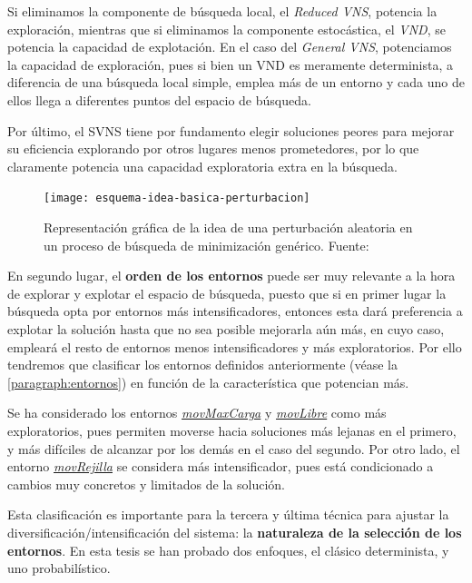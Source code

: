 Si eliminamos la componente de búsqueda local, el \textit{Reduced VNS}, potencia la exploración, mientras que si eliminamos la componente estocástica, el \textit{VND}, se potencia la capacidad de explotación.
En el caso del \textit{General VNS}, potenciamos la capacidad de exploración, pues si bien un VND es meramente determinista, a diferencia de una búsqueda local simple, emplea más de un entorno y cada uno de ellos llega a diferentes puntos del espacio de búsqueda.

Por último, el SVNS tiene por fundamento elegir soluciones peores para mejorar su eficiencia explorando por otros lugares menos prometedores, por lo que claramente potencia una capacidad exploratoria extra en la búsqueda.

\begin{figure}
    \centering    \texttt{[image: esquema-idea-basica-perturbacion]}
    \caption[Representación gráfica de la idea de una perturbación aleatoria en un proceso de búsqueda genérico]{Representación gráfica de la idea de una perturbación aleatoria en un proceso de búsqueda de minimización genérico. Fuente:~\cite{sota:metaheuristicas-design-impl}}
    \label{fig:esquema-idea-basica-perturbacion}
\end{figure}

En segundo lugar, el \textbf{orden de los entornos} puede ser muy relevante a la hora de explorar y explotar el espacio de búsqueda, puesto que si en primer lugar la búsqueda opta por entornos más intensificadores, entonces esta dará preferencia a explotar la solución hasta que no sea posible mejorarla aún más, en cuyo caso, empleará el resto de entornos menos intensificadores y más exploratorios. Por ello tendremos que clasificar los entornos definidos anteriormente (véase la \autoref{paragraph:entornos}) en función de la característica que potencian más.

Se ha considerado los entornos \hyperref[entorno:movMaxCarga]{\textit{movMaxCarga}} y \hyperref[entorno:movLibre]{\textit{movLibre}} como más exploratorios, pues permiten moverse hacia soluciones más lejanas en el primero, y más difíciles de alcanzar por los demás en el caso del segundo. Por otro lado, el entorno \hyperref[entorno:movRejilla]{\textit{movRejilla}} se considera más intensificador, pues está condicionado a cambios muy concretos y limitados de la solución.

Esta clasificación es importante para la tercera y última técnica para ajustar la diversificación/intensificación del sistema: la \textbf{naturaleza de la selección de los entornos}. En esta tesis se han probado dos enfoques, el clásico determinista, y uno probabilístico.

